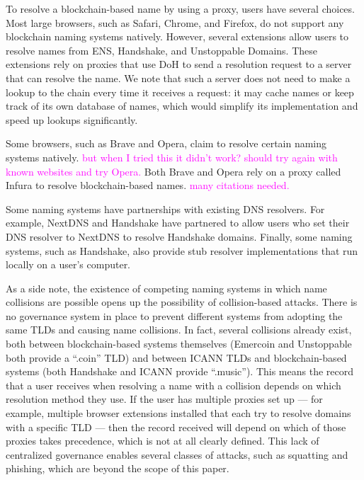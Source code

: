 \documentclass[10pt,sigconf,letterpaper]{acmart}
\newcommand{\randall}{\ding{110}\ding{43}\textcolor{magenta}}
\newcommand{\randall}{}
\begin{document}
To resolve a blockchain-based name by using a proxy, users have several choices. Most large 
browsers, such as Safari, Chrome, and Firefox, do not support any blockchain 
naming systems natively. However, several extensions allow users to resolve names from ENS, 
Handshake, and Unstoppable Domains. These extensions rely on proxies that use 
DoH to send a resolution request to a server that can resolve the name. We 
note that such a server does not need to make a lookup to the chain every time 
it receives a request: it may cache names or keep track of its own database of 
names, which would simplify its implementation and speed up lookups 
significantly. 

Some browsers, such as Brave and Opera, claim to resolve certain naming systems 
natively. \randall{but when I tried this it didn't work? should try again with 
known websites and try Opera.} Both Brave and Opera rely on a proxy called 
Infura to resolve blockchain-based names. \randall{many citations needed.} 

Some naming systems have partnerships with existing DNS resolvers. For example, 
NextDNS and Handshake have partnered to allow users who set their DNS resolver 
to NextDNS to resolve Handshake domains. Finally, some naming systems, such as 
Handshake, also provide stub resolver implementations that run locally on a 
user's computer. 

As a side note, the existence of competing naming systems in which name 
collisions are possible 
opens up the possibility of collision-based attacks. There is no governance 
system in place to prevent different systems from adopting the same TLDs and 
causing name collisions. In fact, several collisions already exist, both 
between blockchain-based systems themselves (Emercoin and Unstoppable both 
provide a ``.coin'' TLD) and between ICANN TLDs and blockchain-based systems 
(both Handshake and ICANN provide ``.music''). 
This means the record that a user receives when resolving a name with a 
collision depends on which resolution method they use. If the user has multiple 
proxies set up --- for example, multiple browser extensions installed that each 
try to resolve domains with a specific TLD --- then the record received will 
depend on which of those proxies takes precedence, which is not at all clearly 
defined. This lack of centralized governance enables several classes of attacks, such as squatting 
and phishing, which are beyond the scope of this paper.
\end{document}
